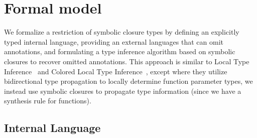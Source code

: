 %




\section{Formal model}
\label{symbolic:section:formal-model}

We formalize a restriction of symbolic closure types by defining an explicitly typed internal language,
providing an external languages that can omit annotations,
and formulating a type inference algorithm based on symbolic closures to recover omitted annotations.
This approach is similar to Local Type Inference~\cite{PierceLTI}
and Colored Local Type Inference~\cite{coloredlti01},
except where they utilize bidirectional type propagation to locally determine function parameter types,
we instead use symbolic closures to propagate type information
(since we have a synthesis rule for functions).

\subsection{Internal Language}

